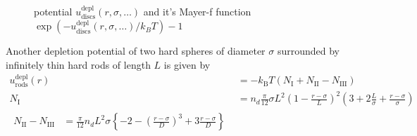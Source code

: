 \begin{figure}[htb]
\centering
  \quad
  \caption{potential $u^\text{depl}_\text{discs}(r,\sigma,\ldots)$ and it's Mayer-f function $\exp(-u^\text{depl}_\text{discs}(r,\sigma,\ldots)/k_BT)-1$}
\end{figure}


Another depletion potential of two hard spheres of diameter $\sigma$ surrounded
by infinitely thin hard rods of length $L$ is given by
\begin{align}
u^\text{depl}_\text{rods}(r) &= -k_\text{B} T (N_\text{I}+N_\text{II}-N_\text{III}) \\
N_\text{I} &= n_d \frac{\pi}{12}\sigma L^2 \left(1-\frac{r-\sigma}{L}\right)^2
                \left(3+2\frac{L}{\sigma}+\frac{r-\sigma}{\sigma}\right)\\
\begin{split}
N_\text{II} - N_\text{III} &= \frac{\pi}{12} n_d L^2\sigma
                              \left\{ -2
                                      -\left(\frac{r-\sigma}{D}\right)^3
                                      +3\frac{r-\sigma}{D}\right\}
\end{split}
\end{align}

